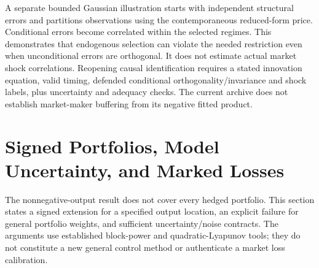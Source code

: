 A separate bounded Gaussian illustration starts with independent structural errors and partitions observations using the contemporaneous reduced-form price. Conditional errors become correlated within the selected regimes. This demonstrates that endogenous selection can violate the needed restriction even when unconditional errors are orthogonal. It does not estimate actual market shock correlations. Reopening causal identification requires a stated innovation equation, valid timing, defended conditional orthogonality/invariance and shock labels, plus uncertainty and adequacy checks. The current archive does not establish market-maker buffering from its negative fitted product.
\section{Signed Portfolios, Model Uncertainty, and Marked Losses}
\label{sec:risk_contract_extensions}
The nonnegative-output result does not cover every hedged portfolio. This section states a signed extension for a specified output location, an explicit failure for general portfolio weights, and sufficient uncertainty/noise contracts. The arguments use established block-power and quadratic-Lyapunov tools; they do not constitute a new general control method or authenticate a market loss calibration.

